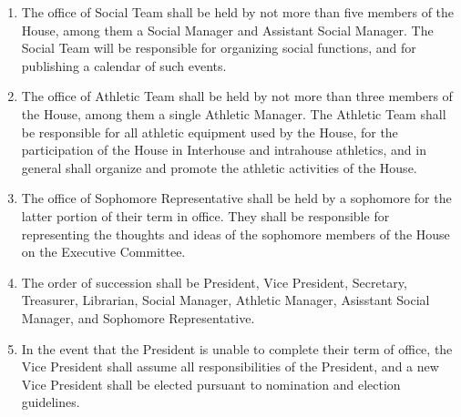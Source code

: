 \documentclass[10pt]{article} %
\begin{document}
\begin{enumerate}
\item The office of Social Team shall be held by not more than five members of the House, among them a Social Manager and Assistant Social Manager. The Social Team will be responsible for organizing social functions, and for publishing a calendar of such events.
\item The office of Athletic Team shall be held by not more than three members of the House, among them a single Athletic Manager. The Athletic Team shall be responsible for all athletic equipment used by the House, for the participation of the House in Interhouse and intrahouse athletics, and in general shall organize and promote the athletic activities of the House.
\item The office of Sophomore Representative shall be held by a sophomore for the latter portion of their term in office. They shall be responsible for representing the thoughts and ideas of the sophomore members of the House on the Executive Committee.
\item The order of succession shall be President, Vice President, Secretary, Treasurer, Librarian, Social Manager, Athletic Manager, Asisstant Social Manager, and Sophomore Representative.
\item \label{PrezSuccession} In the event that the President is unable to complete their term of office, the Vice President shall assume all responsibilities of the President, and a new Vice President shall be elected pursuant to nomination and election guidelines.
\end{enumerate}
\end{document}
